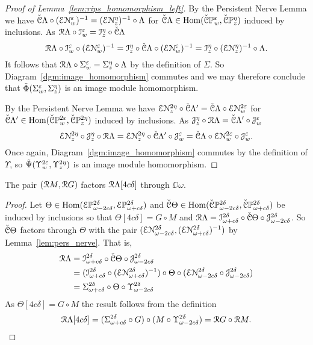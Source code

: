\begin{proof}[Proof of Lemma~\ref{lem:rips_homomorphism_left}]
  By the Persistent Nerve Lemma we have $\check{\mathcal{C}}\Lambda\circ (\mathcal{E}\mathcal{N}_w^\varepsilon)^{-1} = (\mathcal{E}\mathcal{N}_z^\eta)^{-1}\circ \Lambda$ for $\check{\mathcal{C}}\Lambda\in\mathrm{Hom}(\check{\mathcal{C}}\mathbb{P}_{w}^{\varepsilon},\check{\mathcal{C}}\mathbb{P}_{z}^{\eta})$ induced by inclusions.
  As $\mathcal{R}\Lambda\circ\mathcal{I}_w^\varepsilon = \mathcal{I}_z^\eta\circ\check{\mathcal{C}}\Lambda$
  \[ \mathcal{R}\Lambda\circ \mathcal{I}_w^\varepsilon\circ(\mathcal{E}\mathcal{N}_w^\varepsilon)^{-1} = \mathcal{I}_z^\eta\circ\check{\mathcal{C}}\Lambda\circ (\mathcal{E}\mathcal{N}_w^\varepsilon)^{-1} = \mathcal{I}_z^\eta\circ (\mathcal{E}\mathcal{N}_z^\eta)^{-1}\circ\Lambda.\]
  It follows that $\mathcal{R}\Lambda\circ\Sigma_w^\varepsilon = \Sigma_z^\eta\circ\Lambda$ by the definition of $\Sigma$.
  So Diagram~\ref{dgm:image_homomorphism} commutes and we may therefore conclude that $\tilde{\Phi}(\Sigma_w^\varepsilon,\Sigma_z^\eta)$ is an image module homomorphism.

  By the Persistent Nerve Lemma we have $\mathcal{E}\mathcal{N}_z^{2\eta} \circ\check{\mathcal{C}}\Lambda'  = \check{\mathcal{C}} \Lambda\circ \mathcal{E}\mathcal{N}_w^{2\varepsilon}$ for $\check{\mathcal{C}}\Lambda'\in\mathrm{Hom}(\check{\mathcal{C}}\mathbb{P}_{w}^{2\varepsilon},\check{\mathcal{C}}\mathbb{P}_{z}^{2\eta})$ induced by inclusions.
  As $\mathcal{J}_z^\eta\circ \mathcal{R}\Lambda = \check{\mathcal{C}}\Lambda'\circ\mathcal{J}_w^\varepsilon$
  \[ \mathcal{E}\mathcal{N}_z^{2\eta}\circ \mathcal{J}_z^\eta\circ \mathcal{R}\Lambda = \mathcal{E}\mathcal{N}_z^{2\eta}\circ\check{\mathcal{C}}\Lambda'\circ\mathcal{J}_w^\varepsilon = \check{\mathcal{C}} \Lambda\circ \mathcal{E}\mathcal{N}_w^{2\varepsilon}\circ\mathcal{J}_w^\varepsilon.\]
  Once again, Diagram~\ref{dgm:image_homomorphism} commutes by the definition of $\Upsilon$, so $\tilde{\Psi}(\Upsilon_w^{2\varepsilon},\Upsilon_z^{2\eta})$ is an image module homomorphism.
\end{proof}


\begin{lemma}\label{lem:rips_factor_mid}
  The pair $(\mathcal{R} M, \mathcal{R} G)$ factors $\mathcal{R}\Lambda[4c\delta]$ through $\DD{\omega}$.
\end{lemma}
\begin{proof}
  Let $\Theta\in\mathrm{Hom}(\mathcal{E} \mathbb{P}_{\omega-2c\delta}^{2\delta},\mathcal{E} \mathbb{P}_{\omega+c\delta}^{2\delta})$ and $\check{\mathcal{C}}\Theta\in\mathrm{Hom}(\check{\mathcal{C}}\mathbb{P}_{\omega-2c\delta}^{2\delta}, \check{\mathcal{C}}\mathbb{P}_{\omega+c\delta}^{2\delta})$ be induced by inclusions so that $\Theta[4c\delta] = G\circ M$ and $\mathcal{R}\Lambda = \mathcal{I}_{\omega+c\delta}^{2\delta}\circ\check{\mathcal{C}}\Theta\circ\mathcal{J}_{\omega-2c\delta}^{2\delta}$.
  So $\check{\mathcal{C}}\Theta$ factors through $\Theta$ with the pair $(\mathcal{E}\mathcal{N}_{\omega-2c\delta}^{2\delta}, (\mathcal{E}\mathcal{N}_{\omega+c\delta}^{2\delta})^{-1})$ by Lemma~\ref{lem:pers_nerve}.
  That is,
  \begin{align*}
    \mathcal{R}\Lambda &= \mathcal{I}_{\omega+c\delta}^{2\delta}\circ\check{\mathcal{C}}\Theta\circ\mathcal{J}_{\omega-2c\delta}^{2\delta}\\
      &= (\mathcal{I}_{\omega+c\delta}^{2\delta}\circ (\mathcal{E}\mathcal{N}_{\omega+c\delta}^{2\delta})^{-1})\circ \Theta\circ (\mathcal{E}\mathcal{N}_{\omega-2c\delta}^{2\delta}\circ \mathcal{J}_{\omega-2c\delta}^{2\delta})\\
      &= \Sigma_{\omega+c\delta}^{2\delta}\circ \Theta\circ \Upsilon_{\omega-2c\delta}^{2\delta}\\
  \end{align*}
  As $\Theta[4c\delta] = G\circ M$ the result follows from the definition
  \[ \mathcal{R}\Lambda[4c\delta] = (\Sigma_{\omega+c\delta}^{2\delta}\circ G)\circ (M\circ \Upsilon_{\omega-2c\delta}^{2\delta}) = \mathcal{R} G\circ \mathcal{R} M.\]
\end{proof}

